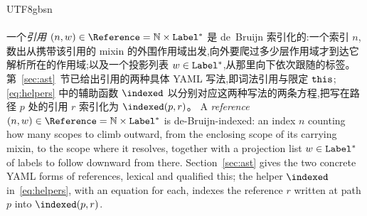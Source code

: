 \begin{CJK*}{UTF8}{gbsn}
\paragraph{}
\ifPaperChinese
一个\emph{引用} $(n, w) \in \Reference = \mathbb{N} \times \Label^{*}$ 是 de~Bruijn 索引化的:一个索引 $n$,数出从携带该引用的 mixin 的外围作用域出发,向外要爬过多少层作用域才到达它解析所在的作用域;以及一个投影列表 $w \in \mathtt{Label}^{*}$,从那里向下依次跟随的标签。第~\ref{sec:ast}~节已给出引用的两种具体 YAML 写法,即词法引用与限定 $\mathtt{this}$;\eqref{eq:helpers} 中的辅助函数 $\indexed$ 以分别对应这两种写法的两条方程,把写在路径 $p$ 处的引用 $r$ 索引化为 $\indexed(p, r)$。
\else
A \emph{reference} $(n, w) \in \Reference = \mathbb{N} \times \Label^{*}$ is de-Bruijn-indexed: an index $n$ counting how many scopes to climb outward, from the enclosing scope of its carrying mixin, to the scope where it resolves, together with a projection list $w \in \mathtt{Label}^{*}$ of labels to follow downward from there. Section~\ref{sec:ast} gives the two concrete YAML forms of references, lexical and qualified this; the helper $\indexed$ in~\eqref{eq:helpers}, with an equation for each, indexes the reference $r$ written at path $p$ into $\indexed(p, r)$.
\fi


\end{CJK*}

